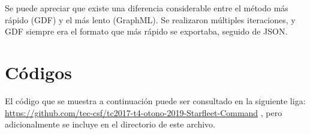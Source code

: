 \documentclass[acmsmall]{acmart}
\begin{document}
Se puede apreciar que existe una diferencia considerable entre el método más rápido (GDF) y el más lento (GraphML). Se realizaron múltiples iteraciones, y GDF siempre era el formato que más rápido se exportaba, seguido de JSON. 


\section{Códigos}

El código que se muestra a continuación puede ser consultado en la siguiente liga: \url{https://github.com/tec-csf/tc2017-t4-otono-2019-Starfleet-Command} , pero adicionalmente se incluye en el directorio de este archivo.


\appendix


 
  
\end{document}
